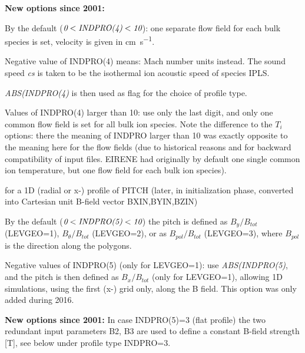 \begin{description}
\begin{description}
                \textbf{New options since 2001:}

                By the default ($\emph{0} < \emph{INDPRO(4)} < \emph{10}$): one separate flow
                field for each bulk species is set, velocity is given in
                \si{\centi\metre\per\second}.

                Negative value of INDPRO(4) means: Mach number units instead.
                The sound speed \emph{cs} is taken to be the isothermal ion acoustic speed of
                species IPLS.

                \emph{ABS(INDPRO(4)} is then used as flag for the choice of profile type.

                Values of INDPRO(4) larger than 10: use only the last digit, and only one
                common flow field is set for all bulk ion species.
                Note the difference to the $T_i$ options:
                there the meaning of INDPRO larger than 10 was exactly opposite
                to the meaning here
                for the flow fields (due to historical reasons and for backward
                compatibility of input
                files.
                EIRENE had originally by default one single common ion temperature, but one
                flow field for each bulk ion species).

          \item[INDPRO(5)] for a 1D (radial or x-) profile of PITCH (later, in
                initialization phase,  converted into Cartesian unit B-field vector
                BXIN,BYIN,BZIN)

                By the default ($\emph{0} < \emph{INDPRO(5)} < \emph{10}$) the pitch is defined
                as $B_y/B_{tot}$ (LEVGEO=1), $B_{\theta}/B_{tot}$ (LEVGEO=2), or as
                $B_{pol}/B_{tot}$ (LEVGEO=3), where $B_{pol}$ is the direction along the
                polygons.

                Negative values of INDPRO(5) (only for LEVGEO=1): use \emph{ABS(INDPRO(5)}, and
                the pitch is then defined as $B_x/B_{tot}$ (only for LEVGEO=1), allowing 1D
                simulations, using the first (x-) grid only, along the B field.
                This option was only added during 2016.

                \textbf{New options since 2001:} In case INDPRO(5)=3 (flat profile) the two
                redundant input parameters B2, B3 are used to define a constant B-field
                strength [T], see below under profile type INDPRO=3.


\end{description}
\end{description}
